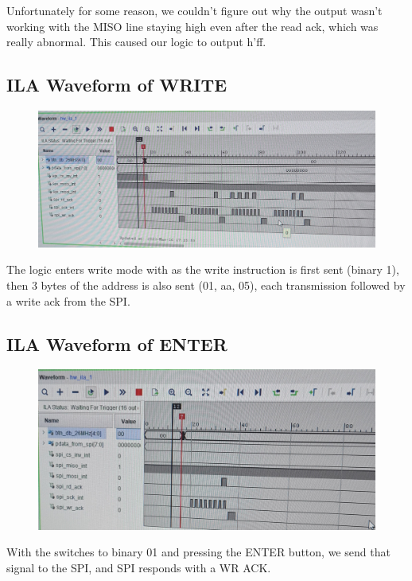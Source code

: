 \documentclass[11pt]{report}
\begin{document}
Unfortunately for some reason, we couldn't figure out why the output wasn't working with the MISO line staying high even after the read ack, which was really abnormal. This caused our logic to output h'ff.

\subsection*{ILA Waveform of WRITE}
\begin{figure}[H]
    \includegraphics[angle=-90,origin=c,width=\columnwidth]{Reports/Proj/Task3/Assets/ILA_write.jpeg}
\end{figure}

The logic enters write mode with as the write instruction is first sent (binary 1), then 3 bytes of the address is also sent (01, aa, 05), each transmission followed by a write ack from the SPI. 

\subsection*{ILA Waveform of ENTER}
\begin{figure}[H]
    \includegraphics[angle=-90,origin=c,width=\columnwidth]{Reports/Proj/Task3/Assets/ILA_enter.jpeg}
\end{figure}

With the switches to binary 01 and pressing the ENTER button, we send that signal to the SPI, and SPI responds with a WR ACK.
\end{document}

